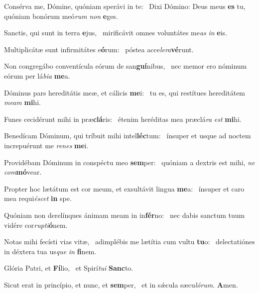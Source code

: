 \item Consérva me, Dómine, quóniam sperávi in te:~\pscross{} Dixi Dómino: Deus meus \textbf{es} tu,~\psstar{} quóniam bonórum meó\textit{rum} \textit{non} \textbf{e}ges.
\item Sanctis, qui sunt in terra \textbf{e}jus,~\psstar{} mirificávit omnes voluntátes me\textit{as} \textit{in} \textbf{e}is.
\item Multiplicátæ sunt infirmitátes e\textbf{ó}rum:~\psstar{} póstea acce\textit{le}\textit{ra}\textbf{vé}runt.
\item Non congregábo conventícula eórum de san\textbf{guí}nibus,~\psstar{} nec memor ero nóminum eórum per lá\textit{bi}\textit{a} \textbf{me}a.
\item Dóminus pars hereditátis meæ, et cálicis \textbf{me}i:~\psstar{} tu es, qui restítues hereditátem \textit{me}\textit{am} \textbf{mi}hi.
\item Funes cecidérunt mihi in præ\textbf{clá}ris:~\psstar{} étenim heréditas mea præclá\textit{ra} \textit{est} \textbf{mi}hi.
\item Benedícam Dóminum, qui tríbuit mihi intel\textbf{léc}tum:~\psstar{} ínsuper et usque ad noctem increpuérunt me \textit{re}\textit{nes} \textbf{me}i.
\item Providébam Dóminum in conspéctu meo \textbf{sem}per:~\psstar{} quóniam a dextris est mihi, \textit{ne} \textit{com}\textbf{mó}vear.
\item Propter hoc lætátum est cor meum, et exsultávit lingua \textbf{me}a:~\psstar{} ínsuper et caro mea requi\textit{é}\textit{scet} \textbf{in} spe.
\item Quóniam non derelínques ánimam meam in in\textbf{fér}no:~\psstar{} nec dabis sanctum tuum vidére cor\textit{rup}\textit{ti}\textbf{ó}nem.
\item Notas mihi fecísti vias vitæ,~\pscross{} adimplébis me lætítia cum vultu \textbf{tu}o:~\psstar{} delectatiónes in déxtera tua us\textit{que} \textit{in} \textbf{fi}nem.
\item Glória Patri, et \textbf{Fí}lio,~\psstar{} et Spirí\textit{tu}\textit{i} \textbf{Sanc}to.
\item Sicut erat in princípio, et nunc, et \textbf{sem}per,~\psstar{} et in sǽcula sæcu\textit{ló}\textit{rum}. \textbf{A}men.
